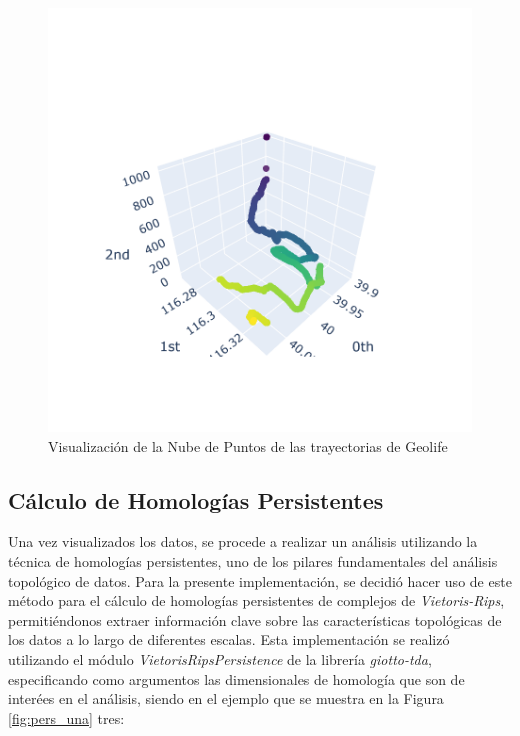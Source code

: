 \begin{figure}[h]
    \centering
    \includegraphics[scale=1]{images/Nube_Puntos.png}
    \caption{Visualización de la Nube de Puntos de las trayectorias de Geolife}
    \label{fig:nube_puntos}
\end{figure}


\vspace{5cm}

\subsection{Cálculo de Homologías Persistentes}

Una vez visualizados los datos, se procede a realizar un análisis utilizando la técnica de homologías persistentes, uno de los pilares fundamentales del análisis topológico de datos. Para la presente implementación, se decidió hacer uso de este método para el cálculo de homologías persistentes de complejos de \textit{Vietoris-Rips}, permitiéndonos extraer información clave sobre las características topológicas de los datos a lo largo de diferentes escalas. Esta implementación se realizó utilizando el módulo \textit{VietorisRipsPersistence} de la librería \textit{giotto-tda}, especificando como argumentos las dimensionales de homología que son de interées en el análisis, siendo en el ejemplo que se muestra en la Figura \ref{fig:pers_una} tres:

